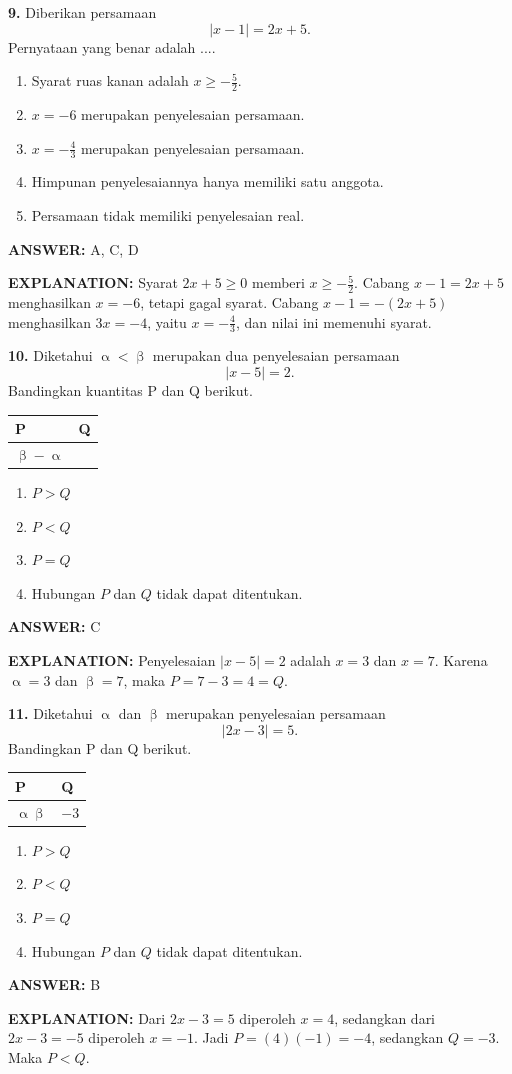\documentclass[11pt,a4paper]{article}
\newcommand{\answer}[1]{\par\medskip\textbf{\color{jawab}ANSWER:} #1\par}
\newcommand{\explanation}[1]{\textbf{\color{jelas}EXPLANATION:} #1\par\medskip}
\newcommand{\question}[1]{\Needspace{8\baselineskip}\par\medskip\textbf{#1}\quad}
\newenvironment{choices}{\begin{enumerate}[label=\Alph*.,leftmargin=1.8em]}{\end{enumerate}}
\begin{document}
\question{9.} Diberikan persamaan
\[
|x-1|=2x+5.
\]
Pernyataan yang benar adalah ....
\begin{choices}
\item Syarat ruas kanan adalah $x\ge-\frac52$.
\item $x=-6$ merupakan penyelesaian persamaan.
\item $x=-\frac43$ merupakan penyelesaian persamaan.
\item Himpunan penyelesaiannya hanya memiliki satu anggota.
\item Persamaan tidak memiliki penyelesaian real.
\end{choices}
\answer{A, C, D}
\explanation{Syarat $2x+5\ge0$ memberi $x\ge-\frac52$. Cabang $x-1=2x+5$ menghasilkan $x=-6$, tetapi gagal syarat. Cabang $x-1=-(2x+5)$ menghasilkan $3x=-4$, yaitu $x=-\frac43$, dan nilai ini memenuhi syarat.}

\question{10.} Diketahui $\upalpha<\upbeta$ merupakan dua penyelesaian persamaan
\[
|x-5|=2.
\]
Bandingkan kuantitas P dan Q berikut.
\begin{center}
\begin{tabular}{|>{\centering\arraybackslash}p{}|>{\centering\arraybackslash}p{}|}
\hline
\textbf{P} & \textbf{Q} \\
\hline
$\upbeta-\upalpha$ & 4 \\
\hline
\end{tabular}
\end{center}
\begin{choices}
\item $P>Q$
\item $P<Q$
\item $P=Q$
\item Hubungan $P$ dan $Q$ tidak dapat ditentukan.
\end{choices}
\answer{C}
\explanation{Penyelesaian $|x-5|=2$ adalah $x=3$ dan $x=7$. Karena $\upalpha=3$ dan $\upbeta=7$, maka $P=7-3=4=Q$.}

\question{11.} Diketahui $\upalpha$ dan $\upbeta$ merupakan penyelesaian persamaan
\[
|2x-3|=5.
\]
Bandingkan P dan Q berikut.
\begin{center}
\begin{tabular}{|>{\centering\arraybackslash}p{}|>{\centering\arraybackslash}p{}|}
\hline
\textbf{P} & \textbf{Q} \\
\hline
$\upalpha\upbeta$ & $-3$ \\
\hline
\end{tabular}
\end{center}
\begin{choices}
\item $P>Q$
\item $P<Q$
\item $P=Q$
\item Hubungan $P$ dan $Q$ tidak dapat ditentukan.
\end{choices}
\answer{B}
\explanation{Dari $2x-3=5$ diperoleh $x=4$, sedangkan dari $2x-3=-5$ diperoleh $x=-1$. Jadi $P=(4)(-1)=-4$, sedangkan $Q=-3$. Maka $P<Q$.}
\end{document}
